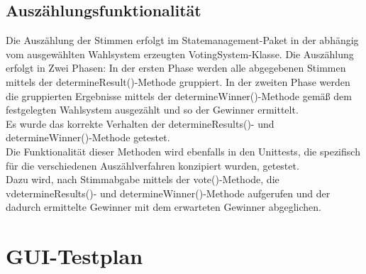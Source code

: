 \documentclass[parskip=full]{scrartcl}
\begin{document}
\subsection{Auszählungsfunktionalität}
Die Auszählung der Stimmen erfolgt im Statemanagement-Paket in der abhängig vom ausgewählten Wahlsystem erzeugten VotingSystem-Klasse.
Die Auszählung erfolgt in Zwei Phasen: In der ersten Phase werden alle abgegebenen Stimmen mittels der determineResult()-Methode gruppiert.
In der zweiten Phase werden die gruppierten Ergebnisse mittels der determineWinner()-Methode gemäß dem festgelegten Wahlsystem ausgezählt und so der Gewinner ermittelt.\\
Es wurde das korrekte Verhalten der determineResults()- und determineWinner()-Methode getestet.\\
Die Funktionalität dieser Methoden wird ebenfalls in den Unittests, die spezifisch für die verschiedenen Auszählverfahren konzipiert wurden, getestet.\\
Dazu wird, nach Stimmabgabe mittels der vote()-Methode, die vdetermineResults()- und determineWinner()-Methode aufgerufen und der dadurch ermittelte Gewinner mit dem erwarteten Gewinner abgeglichen.

\section{GUI-Testplan}
\end{document}
